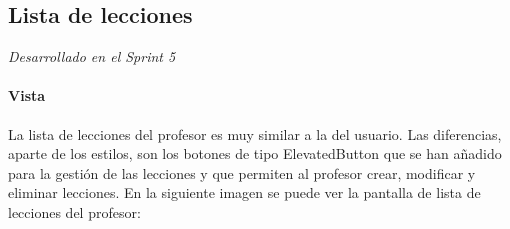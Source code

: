 \newpage

\subsection{Lista de lecciones} 
\textit{Desarrollado en el Sprint 5}

\paragraph*{Vista}
La lista de lecciones del profesor es muy similar a la del usuario. Las diferencias, aparte de los estilos, son los botones de tipo ElevatedButton
 que se han añadido para la gestión de las lecciones y que permiten al profesor crear, modificar y eliminar lecciones.
  En la siguiente imagen se puede ver la pantalla de lista de lecciones del profesor:

